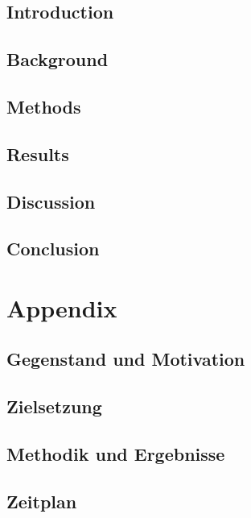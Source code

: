 \documentclass[12pt,toc=bib,toc=listof]{scrreprt}
\begin{document}
\begin{otherlanguage}{english}


\section{Introduction}


\section{Background}


\section{Methods}


\section{Results}


\section{Discussion}


\section{Conclusion}



 

\endgroup
\end{otherlanguage}

\clearpage
\onecolumn
\restoregeometry 
{}
\pagestyle{scrheadings}

\appendix
\chapter{Appendix}

\section{Gegenstand und Motivation}


\section{Zielsetzung}


\section{Methodik und Ergebnisse}

\begin{landscape}
\section{Zeitplan}

\end{landscape}
\end{document}
